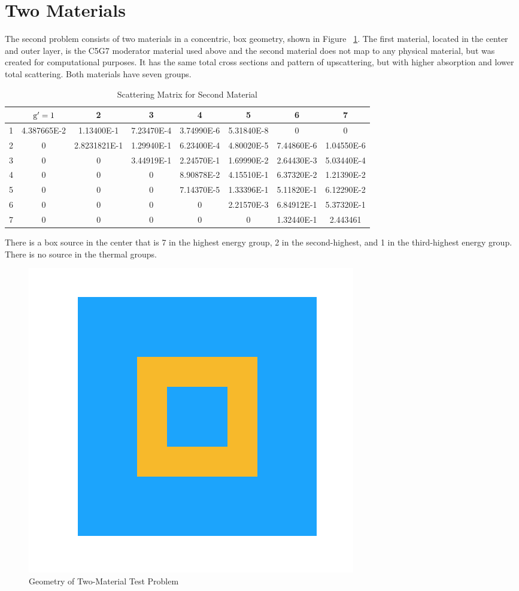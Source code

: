 \section{Two Materials}
The second problem consists of two materials in a concentric, box geometry, shown in Figure ~\ref{fig:test_geometry}. 
The first material, located in the center and outer layer, is the C5G7 moderator material used above and the second material does not map to any physical material, but was created for computational purposes. It has the same total cross sections and pattern of upscattering, but with higher absorption and lower total scattering. Both materials have seven groups. 

 \begin{table}[!htb]
\small
\centering
\caption{Scattering Matrix for Second Material}
    \label{tab:two}
\begin{center}
    \begin{tabular}{|c|c|c|c|c|c|c|c|}
\hline
 & $\mathrm{g}'=1$ & 2 & 3 & 4 & 5 & 6 & 7 \\ 
\hline
1 & 4.387665E-2 & 1.13400E-1   &  7.23470E-4 & 3.74990E-6 & 5.31840E-8  &     0    &     0    \\
\hline
2 & 0        &    2.8231821E-1  & 1.29940E-1 & 6.23400E-4 & 4.80020E-5 & 7.44860E-6 & 1.04550E-6 \\
\hline
3 & 0       &        0    &       3.44919E-1 & 2.24570E-1 & 1.69990E-2 & 2.64430E-3 & 5.03440E-4 \\
\hline
4 & 0         &      0      &         0     &  8.90878E-2 & 4.15510E-1 & 6.37320E-2 & 1.21390E-2 \\
\hline
5 & 0     &          0       &        0   &    7.14370E-5 & 1.33396E-1 & 5.11820E-1 & 6.12290E-2 \\
\hline
6 & 0   &        0      &         0   &        0     &  2.21570E-3 & 6.84912E-1 & 5.37320E-1 \\
\hline
7 & 0      &         0        &       0    &       0    &       0    &   1.32440E-1 & 2.443461  \\
\hline
    \end{tabular}
\end{center}
\end{table}

There is a box source in the center that is 7 in the highest energy group, 2 in the second-highest, and 1 in the third-highest energy group. There is no source in the thermal groups.
\begin{figure}[H]
    \centering
    \includegraphics[width=.3\textwidth]{fig/Geometry.png}
    \caption{Geometry of Two-Material Test Problem}
    \label{fig:test_geometry}
\end{figure}

